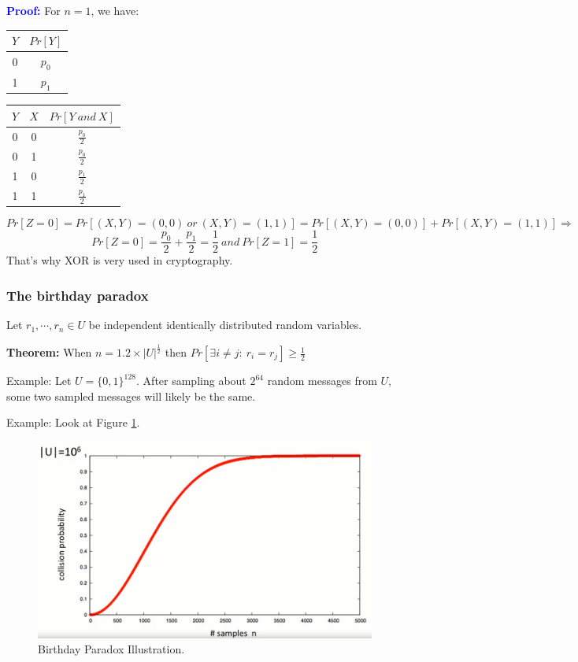 \documentclass[12pt]{book}
\newcommand{\Thm}{\textbf{Theorem:} }
\newcommand{\Proof}{\textcolor{blue}{\textbf{Proof:}} }
\begin{document}
\Proof For $n=1$, we have:
\begin{center}
	\begin{tabular}{c|c}
		$Y$&$Pr[Y]$\\\hline
		0&$p_{0}$\\
		1&$p_{1}$
	\end{tabular}\hskip1cm
	\begin{tabular}{c|c|c}
		$Y$&$X$&$Pr[Y\ and\ X]$\\\hline
		0&0&$\frac{p_{0}}{2}$\\
		0&1&$\frac{p_{0}}{2}$\\
		1&0&$\frac{p_{1}}{2}$\\
		1&1&$\frac{p_{1}}{2}$
	\end{tabular}
\end{center}
$$Pr[Z=0]=Pr[(X,Y)=(0,0)\ or\ (X,Y)=(1,1)]=Pr[(X,Y)=(0,0)]+Pr[(X,Y)=(1,1)]\Longrightarrow$$
$$Pr[Z=0]=\frac{p_{0}}{2}+\frac{p_{1}}{2}=\frac{1}{2}\ and\ Pr[Z=1]=\frac{1}{2}$$
That's why XOR is very used in cryptography.

\subsubsection{The birthday paradox}
Let $r_{1},\cdots,r_{n}\in U$ be independent identically distributed random variables.

\Thm When $n=1.2 \times |U|^{\frac{1}{2}}$ then $Pr[\exists i\neq j:\ r_{i}=r_{j}]\geq \frac{1}{2}$

Example: Let $U=\{0,1\}^{128}$. After sampling about $2^{64}$ random messages from $U$, some two sampled messages will likely be the same.

Example: Look at Figure \ref{fig:birthday_paradox}.
\begin{figure}[h]
	\centering
	\includegraphics[width=.7\textwidth]{birthday_paradox}
	\caption{Birthday Paradox Illustration.}
	\label{fig:birthday_paradox}
\end{figure}
\end{document}
